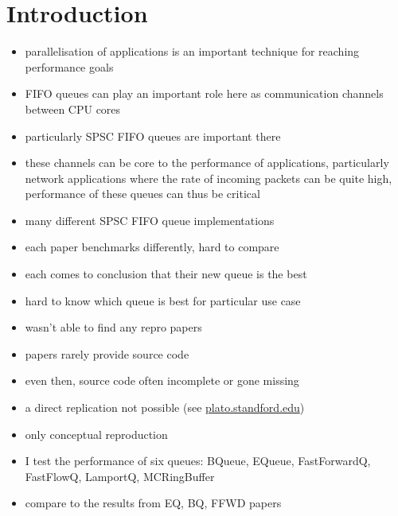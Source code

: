 \section{Introduction}
\begin{itemize}
    \item parallelisation of applications is an important technique for reaching performance goals
    \item FIFO queues can play an important role here as communication channels between CPU cores
    \item particularly SPSC FIFO queues are important there
    \item these channels can be core to the performance of applications, particularly network applications
        where the rate of incoming packets can be quite high, performance of these queues can thus be critical
    \item many different SPSC FIFO queue implementations
    \item each paper benchmarks differently, hard to compare
    \item each comes to conclusion that their new queue is the best
    \item hard to know which queue is best for particular use case
    \item wasn't able to find any repro papers 
    \item papers rarely provide source code
    \item even then, source code often incomplete or gone missing
    \item a direct replication not possible (see
            \href{https://plato.stanford.edu/entries/scientific-reproducibility/#:~:text=direct
                replication%
                conceptual%
                to%
        }{plato.standford.edu})
    \item only conceptual reproduction
    \item I test the performance of six queues: BQueue, EQueue, FastForwardQ, FastFlowQ, LamportQ, MCRingBuffer
        \cite{B-Queue}\cite{EQueue}\cite{FastForward}\cite{FastFlowGithub}\cite{Lamport}\cite{MCRingBuffer}
    \item compare to the results from EQ, BQ, FFWD papers

\end{itemize}
